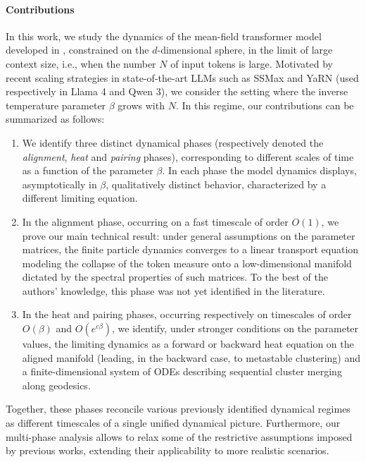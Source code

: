 \documentclass{article}
\numberwithin{theorem}{section}
\begin{document}
\paragraph{Contributions} In this work, we study the dynamics of the mean-field transformer model developed in \cite{sander2022sinkformers,geshkovski2023mathematical}, constrained on the $d$-dimensional sphere, in the limit of large context size, i.e., when the number $N$ of input tokens is large. Motivated by recent scaling strategies in state-of-the-art LLMs such as SSMax \cite{nakanishi2025scalable} and YaRN \cite{peng2023yarn} (used respectively in Llama 4 and Qwen 3), we consider the setting where the inverse temperature parameter $\beta$ grows with $N$. In this regime, our contributions can be summarized as follows:
\begin{enumerate}
\item We identify three distinct dynamical phases (respectively denoted the \emph{alignment}, \emph{heat} and \emph{pairing} phases), corresponding to different scales of time as a function of the parameter $\beta$. In each phase the model dynamics displays, asymptotically in $\beta$, qualitatively distinct behavior, characterized by a different limiting equation.
\item In the alignment phase, occurring on a fast timescale of order $O(1)$, we prove our main technical result: under general assumptions on the parameter matrices, the finite particle dynamics converges to a linear transport equation modeling the collapse of the token measure onto a low-dimensional manifold dictated by the spectral properties of such matrices. To the best of the authors' knowledge, this phase was not yet identified in the literature.
\item In the heat and pairing phases, occurring respectively on timescales of order $O(\beta)$ and $O(e^{c\beta})$, we identify, under stronger conditions on the parameter values, the limiting dynamics as a forward or backward heat equation on the aligned manifold (leading, in the backward case, to metastable clustering) and a finite-dimensional system of ODEs describing sequential cluster merging along geodesics.
\end{enumerate}
Together, these phases reconcile various previously identified dynamical regimes as different timescales of a single unified dynamical picture. Furthermore, our multi-phase analysis allows to relax some of the restrictive assumptions imposed by previous works, extending their applicability to more realistic scenarios.
\end{document}

